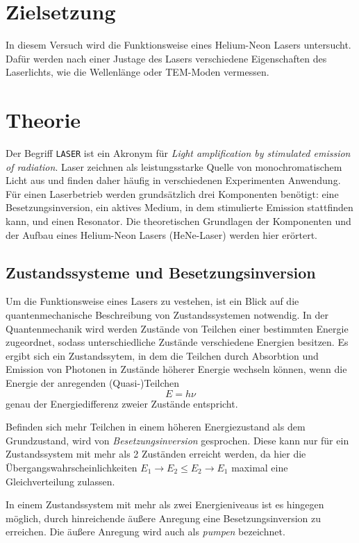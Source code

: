 \section{Zielsetzung}
In diesem Versuch wird die Funktionsweise eines Helium-Neon Lasers untersucht. Dafür werden nach einer Justage des Lasers 
verschiedene Eigenschaften des Laserlichts, wie die Wellenlänge oder TEM-Moden vermessen.

\section{Theorie}
\label{sec:Theorie}

Der Begriff \texttt{LASER} ist ein Akronym für \textit{Light amplification by stimulated emission of radiation}. Laser zeichnen als
leistungsstarke Quelle von monochromatischem Licht aus und finden daher häufig in verschiedenen Experimenten Anwendung. Für einen Laserbetrieb werden grundsätzlich
drei Komponenten benötigt: eine Besetzungsinversion, ein aktives Medium, in dem stimulierte Emission stattfinden kann, und einen Resonator. Die theoretischen
Grundlagen der Komponenten und der Aufbau eines Helium-Neon Lasers (HeNe-Laser) werden hier erörtert.

\subsection{Zustandssysteme und Besetzungsinversion}
Um die Funktionsweise eines Lasers zu vestehen, ist ein Blick auf die quantenmechanische Beschreibung von Zustandssystemen notwendig.
In der Quantenmechanik wird werden Zustände von Teilchen einer bestimmten Energie zugeordnet, sodass unterschiedliche Zustände verschiedene
Energien besitzen. Es ergibt sich ein Zustandssytem, in dem die Teilchen durch Absorbtion und Emission von Photonen in Zustände höherer Energie wechseln können,
wenn die Energie der anregenden (Quasi-)Teilchen
\begin{equation}
    E = h\nu
\end{equation}
genau der Energiedifferenz zweier Zustände entspricht.

Befinden sich mehr Teilchen in einem höheren Energiezustand als dem Grundzustand, wird von \textit{Besetzungsinversion} gesprochen. Diese kann
nur für ein Zustandssystem mit mehr als 2 Zuständen erreicht werden, da hier die Übergangswahrscheinlichkeiten $E_1 \rightarrow E_2 ≤ E_2 \rightarrow E_1$
maximal eine Gleichverteilung zulassen.

In einem Zustandssystem mit mehr als zwei Energieniveaus ist es hingegen möglich, durch hinreichende äußere Anregung eine Besetzungsinversion zu erreichen. 
Die äußere Anregung wird auch als \textit{pumpen} bezeichnet.

